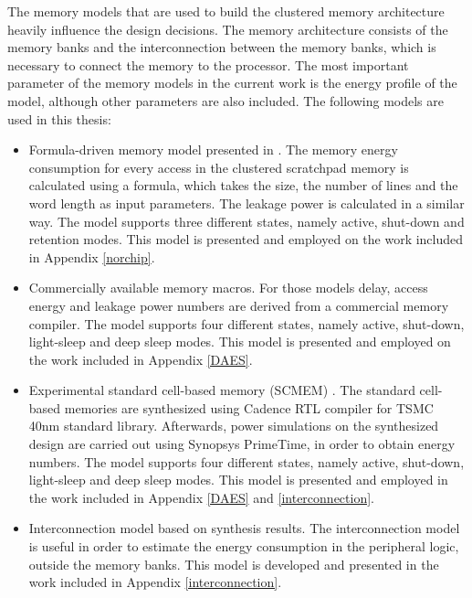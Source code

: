 The memory models that are used to build the clustered memory architecture heavily influence the design decisions.
The memory architecture consists of the memory banks and the interconnection between the memory banks, which is necessary to connect the memory to the processor.
The most important parameter of the memory models in the current work is the energy profile of the model, although other parameters are also included.
The following models are used in this thesis:
\begin{itemize}
\item Formula-driven memory model presented in \cite{Artes2011}.
The memory energy consumption for every access in the clustered scratchpad memory is calculated using a formula, which takes the size, the number of lines and the word length as input parameters.
The leakage power is calculated in a similar way.
The model supports three different states, namely active, shut-down and retention modes.
This model is presented and employed on the work included in Appendix \ref{norchip}.

\item Commercially available memory macros.  
For those models delay, access energy and leakage power numbers are derived from a commercial memory compiler.
The model supports four different states, namely active, shut-down, light-sleep and deep sleep modes.
This model is presented and employed on the work included in Appendix \ref{DAES}.

\item Experimental standard cell-based memory (SCMEM)  \cite{Mei11} .
The standard cell-based memories are synthesized using Cadence RTL compiler for TSMC 40nm standard library. 
Afterwards, power simulations on the synthesized design are carried out using Synopsys PrimeTime, in order to obtain energy numbers.
The model supports four different states, namely active, shut-down, light-sleep and deep sleep modes.
This model is presented and employed in the work included in Appendix \ref{DAES} and \ref{interconnection}.

\item Interconnection model based on synthesis results.
The interconnection model is useful in order to estimate the energy consumption in the peripheral logic, outside the memory banks.
This model is developed and presented in the work included in Appendix \ref{interconnection}.

\end{itemize}

